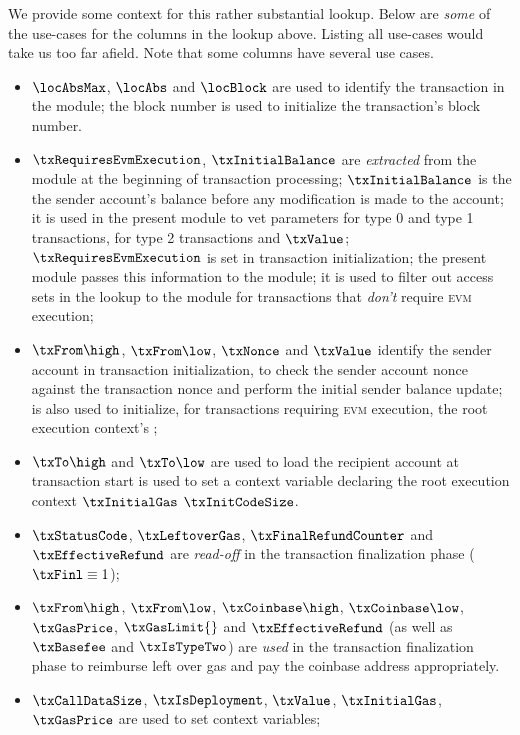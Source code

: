 \noindent We provide some context for this rather substantial lookup. Below are \emph{some} of the use-cases for the columns in the lookup above. Listing all use-cases would take us too far afield. Note that some columns have several use cases.
\begin{itemize}
	\item 
		$\locAbsMax$,
		$\locAbs$ and $\locBlock$
		are used to identify the transaction in the \hubMod{} module;
		the block number is used to initialize the transaction's block number.
	\item 
		$\txRequiresEvmExecution$, $\txInitialBalance$ are \emph{extracted} from the \hubMod{} module at the beginning of transaction processing;
		$\txInitialBalance$ is the the sender account's balance before any modification is made to the account; it is used in the present module to vet  parameters for type 0 and type 1 transactions,  for type 2 transactions and $\txValue$;
		$\txRequiresEvmExecution$ is set in transaction initialization; the present module passes this information to the \rlpTxnMod{} module; it is used to filter out access sets in the lookup to the \hubMod{} module for transactions that \emph{don't} require \textsc{evm} execution; 
	\item
		$\txFrom\high$, $\txFrom\low$,
		$\txNonce$ and $\txValue$
		identify the sender account in transaction initialization, to check the sender account nonce \accNonce{} against the transaction nonce \txNonce{} and perform the initial sender balance update;  is also used to initialize, for transactions requiring \textsc{evm} execution, the root execution context's \cnCallValue{};
	\item
		$\txTo\high$ and $\txTo\low$ are used to load the recipient account at transaction start
		 is used to set a context variable declaring the root execution context 
		$\txInitialGas$
		$\txInitCodeSize$.
	\item 
		$\txStatusCode$,
		$\txLeftoverGas$,
		$\txFinalRefundCounter$ and
		$\txEffectiveRefund$ are \emph{read-off} in the transaction finalization phase ($\txFinl \equiv 1$);
	\item 
		$\txFrom\high$, $\txFrom\low$,
		$\txCoinbase\high$, $\txCoinbase\low$,
		$\txGasPrice$, 
		$\txGasLimit{}$ and
		$\txEffectiveRefund$
		(as well as $\txBasefee$ and $\txIsTypeTwo$) are \emph{used} in the transaction finalization phase to reimburse left over gas and pay the coinbase address appropriately.
	\item
		$\txCallDataSize$, $\txIsDeployment$, $\txValue$, $\txInitialGas$, $\txGasPrice$ are used to set context variables;
\end{itemize}
